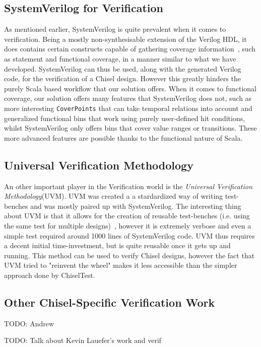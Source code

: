 \documentclass[conference]{IEEEtran}
\newcommand{\todo}[1]{{\color{olive} TODO: #1}}
\begin{document}
\subsection{SystemVerilog for Verification}
As mentioned earlier, SystemVerilog is quite prevalent when it comes to verification. Being a mostly non-synthesisable extension of the Verilog HDL, it does contains certain constructs capable of gathering coverage information~\cite{spear2008systemverilog}, such as statement and functional coverage, in a manner similar to what we have developed. SystemVerilog can thus be used, along with the generated Verilog code, for the verification of a Chisel design. However this greatly hinders the purely Scala based workflow that our solution offers. When it comes to functional coverage, our solution offers many features that SystemVerilog does not, such as more interesting \texttt{CoverPoints} that can take temporal relations into account and generalized functional bins that work using purely user-defined hit conditions, whilst SystemVerilog only offers bins that cover value ranges or transitions. These more advanced features are possible thanks to the functional nature of Scala. 

\subsection{Universal Verification Methodology}
An other important player in the Verification world is the \textit{Universal Verification Methodology}(UVM). UVM was created a a stardardized way of writing test-benches and was mostly paired up with SystemVerilog. The interesting thing about UVM is that it allows for the creation of reusable test-benches (i.e. using the same test for multiple designs)~\cite{uvm2015}, however it is extremely verbose and even a simple test required around 1000 lines of SystemVerilog code. UVM thus requires a decent initial time-investment, but is quite reusable once it gets up and running. This method can be used to verify Chisel designs, however the fact that UVM tried to "reinvent the wheel" makes it less accessible than the simpler approach done by ChiselTest.

\subsection{Other Chisel-Specific Verification Work}


\todo{Andrew}

\todo{Talk about Kevin Lauefer's work and verif}
\end{document}
